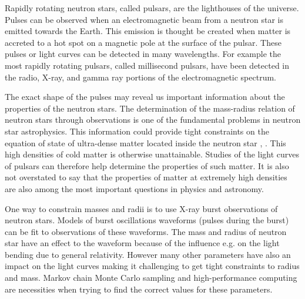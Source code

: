 \documentclass{wihuri}
\begin{document}
Rapidly rotating neutron stars, called pulsars, are the lighthouses of the universe. Pulses can be observed when an electromagnetic beam from a neutron star is emitted towards the Earth.  This emission is thought be created when matter is accreted to a hot spot on a magnetic pole at the surface of the pulsar. These pulses or light curves can be detected in many wavelengths. For example the most rapidly rotating pulsars, called millisecond pulsars, have been detected in the radio, X-ray, and gamma ray portions of the electromagnetic spectrum.

The exact shape of the pulses may reveal us important information about the properties of the neutron stars. The determination of the mass-radius relation of neutron stars through observations is one of the fundamental problems in neutron star astrophysics. This information could provide tight constraints on the equation of state of ultra-dense matter located inside the neutron star \cite{lattimer2007}, \cite{hebeler}. This high densities of cold matter is otherwise unattainable. Studies of the light curves of pulsars can therefore help determine the properties of such matter. It is also not overstated to say that the properties of matter at extremely high densities are also among the most important questions in physics and astronomy. 


One way to constrain masses and radii is to use X-ray burst observations of neutron stars. Models of burst oscillations waveforms (pulses during the burst) can be fit to observations of these waveforms. The mass and radius of neutron star have an effect to the waveform because of the influence e.g. on the light bending due to general relativity. However many other parameters have also an impact on the light curves making it challenging to get tight constraints to radius and mass. Markov chain Monte Carlo sampling and high-performance computing are necessities when trying to find the correct values for these parameters. 








\vspace{10cm}











\iffalse 
\end{document}
